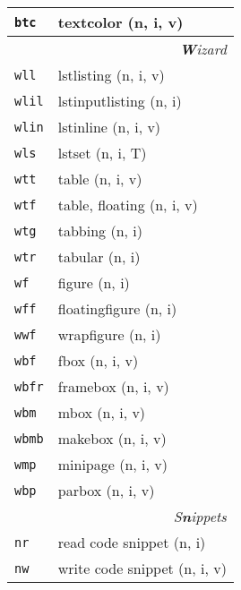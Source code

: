 \documentclass[oneside,10pt,landscape,DIV16]{scrartcl}
\newcommand{\Map}[1] {\textbf{\textasciiacute}\texttt{#1}}
\begin{document}
\begin{multicols}{3}
\begin{center}
\begin{tabular}[]{|p{11mm}|p{60mm}|}
\hline \Map{btc} & textcolor       \hfill (n, i, v)\\
\hline
\hline
\multicolumn{2}{|r|}{\textsl{\textbf{W}izard}}\\[1.0ex]
\hline  \Map{wll}  & lstlisting               \hfill (n, i, v)\\
\hline  \Map{wlil} & lstinputlisting          \hfill (n, i)\\
\hline  \Map{wlin} & lstinline                \hfill (n, i, v)\\
\hline  \Map{wls}  & lstset                   \hfill (n, i, T)\\
\hline
\hline  \Map{wtt}  & table                    \hfill (n, i, v)\\
\hline  \Map{wtf}  & table, floating          \hfill (n, i, v)\\
\hline  \Map{wtg}  & tabbing                  \hfill (n, i)\\
\hline  \Map{wtr}  & tabular                  \hfill (n, i)\\
\hline
\hline  \Map{wf}   & figure                   \hfill (n, i)\\
\hline  \Map{wff}  & floatingfigure           \hfill (n, i)\\
\hline  \Map{wwf}  & wrapfigure               \hfill (n, i)\\
\hline
\hline  \Map{wbf}  & fbox                     \hfill (n, i, v)\\
\hline  \Map{wbfr} & framebox                 \hfill (n, i, v)\\
\hline  \Map{wbm}  & mbox                     \hfill (n, i, v)\\
\hline  \Map{wbmb} & makebox                  \hfill (n, i, v)\\
\hline  \Map{wmp}  & minipage                 \hfill (n, i, v)\\
\hline  \Map{wbp}  & parbox                   \hfill (n, i, v)\\
\hline
\hline
\multicolumn{2}{|r|}{\textsl{S\textbf{n}ippets}}                \\[1.0ex]
\hline \Map{nr}  & read code snippet         \hfill (n, i)   \\
\hline \Map{nw}  & write code snippet        \hfill (n, i, v)\\

\end{tabular}
\end{center}
\end{multicols}
\end{document}

